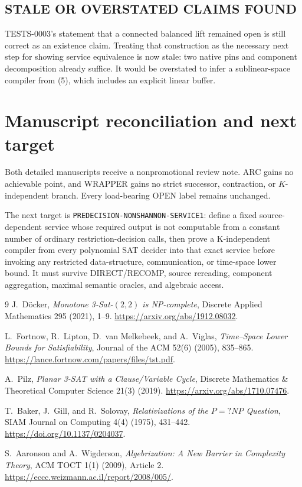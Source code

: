 \documentclass[11pt]{article}
\begin{document}
\subsection*{STALE OR OVERSTATED CLAIMS FOUND}
TESTS-0003's statement that a connected balanced lift remained open is still
correct as an existence claim.  Treating that construction as the necessary
next step for showing service equivalence is now stale: two native pins and
component decomposition already suffice.  It would be overstated to infer a
sublinear-space compiler from (5), which includes an explicit linear buffer.

\section{Manuscript reconciliation and next target}

Both detailed manuscripts receive a nonpromotional review note.  ARC gains no
achievable point, and WRAPPER gains no strict successor, contraction, or
$K$-independent branch.  Every load-bearing OPEN label remains unchanged.

The next target is \texttt{PREDECISION-NONSHANNON-SERVICE1}: define a fixed
source-dependent service whose required output is not computable from a
constant number of ordinary restriction-decision calls, then prove a
K-independent compiler from every polynomial SAT decider into that exact
service before invoking any restricted data-structure, communication, or
time-space lower bound.  It must survive DIRECT/RECOMP, source rereading,
component aggregation, maximal semantic oracles, and algebraic access.

\begin{thebibliography}{9}
J.~D\"ocker,
\emph{Monotone 3-Sat-$(2,2)$ is NP-complete},
Discrete Applied Mathematics 295 (2021), 1--9.
\url{https://arxiv.org/abs/1912.08032}.

L.~Fortnow, R.~Lipton, D.~van Melkebeek, and A.~Viglas,
\emph{Time--Space Lower Bounds for Satisfiability},
Journal of the ACM 52(6) (2005), 835--865.
\url{https://lance.fortnow.com/papers/files/tst.pdf}.

A.~Pilz,
\emph{Planar 3-SAT with a Clause/Variable Cycle},
Discrete Mathematics \& Theoretical Computer Science 21(3) (2019).
\url{https://arxiv.org/abs/1710.07476}.

T.~Baker, J.~Gill, and R.~Solovay,
\emph{Relativizations of the $P=?NP$ Question},
SIAM Journal on Computing 4(4) (1975), 431--442.
\url{https://doi.org/10.1137/0204037}.

S.~Aaronson and A.~Wigderson,
\emph{Algebrization: A New Barrier in Complexity Theory},
ACM TOCT 1(1) (2009), Article 2.
\url{https://eccc.weizmann.ac.il/report/2008/005/}.
\end{thebibliography}
\end{document}
